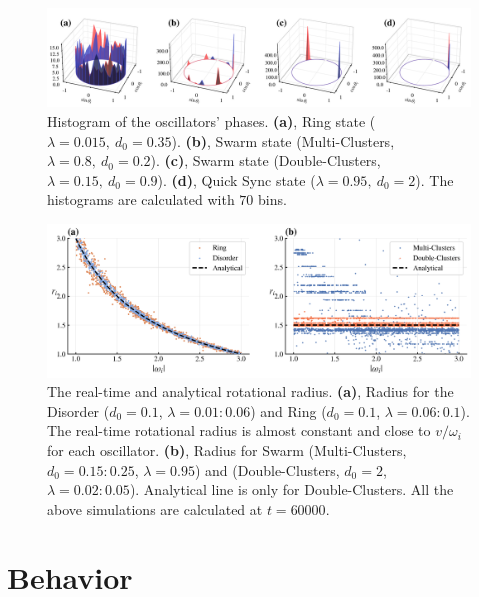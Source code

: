 \documentclass[%
 aip,
 amsmath,amssymb,
 reprint,%
]{revtex4-1}
\begin{document}
\begin{figure}
    \includegraphics[width=\textwidth]{./figs/phaseHist.pdf}
    \caption{
        \label{fig:phaseHist} Histogram of the oscillators' phases.
        \textbf{(a)}, Ring state ($\lambda=0.015,\ d_0=0.35$).
        \textbf{(b)}, Swarm state (Multi-Clusters, $\lambda=0.8,\ d_0=0.2$).
        \textbf{(c)}, Swarm state (Double-Clusters, $\lambda=0.15,\ d_0=0.9$).
        \textbf{(d)}, Quick Sync state ($\lambda=0.95,\ d_0=2$). The histograms are calculated with $70$ bins.
    }
\end{figure}

\begin{figure}
    \includegraphics[width=\textwidth]{./figs/radiusOmega.png}
    \caption{
        \label{fig:radiusOmega} The real-time and analytical rotational radius.
        \textbf{(a)}, Radius for the Disorder ($d_0=0.1$, $\lambda=0.01:0.06$) and Ring ($d_0=0.1$, $\lambda=0.06:0.1$). The real-time rotational radius is almost constant and close to $v/\omega_i$ for each oscillator. 
        \textbf{(b)}, Radius for Swarm (Multi-Clusters, $d_0=0.15:0.25$, $\lambda=0.95$) and (Double-Clusters, $d_0=2$, $\lambda=0.02:0.05$). Analytical line is only for Double-Clusters.
        All the above simulations are calculated at $t=60000$. 
    }
\end{figure}

\section{\label{sec:behavior}Behavior}
\end{document}

